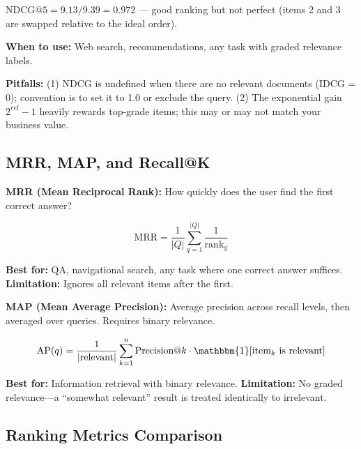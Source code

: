 $\text{NDCG}@5 = 9.13 / 9.39 = 0.972$ --- good ranking but not perfect (items 2 and 3 are swapped relative to the ideal order).

\textbf{When to use:} Web search, recommendations, any task with graded relevance labels.

\textbf{Pitfalls:} (1) NDCG is undefined when there are no relevant documents (IDCG = 0); convention is to set it to 1.0 or exclude the query. (2) The exponential gain $2^{rel} - 1$ heavily rewards top-grade items; this may or may not match your business value.

\subsection{MRR, MAP, and Recall@K}

\textbf{MRR (Mean Reciprocal Rank):} How quickly does the user find the first correct answer?

\[
\text{MRR} = \frac{1}{|Q|}\sum_{q=1}^{|Q|} \frac{1}{\text{rank}_q}
\]

\textbf{Best for:} QA, navigational search, any task where one correct answer suffices. \textbf{Limitation:} Ignores all relevant items after the first.

\textbf{MAP (Mean Average Precision):} Average precision across recall levels, then averaged over queries. Requires binary relevance.

\[
\text{AP}(q) = \frac{1}{|\text{relevant}|}\sum_{k=1}^{n} \text{Precision}@k \cdot \mathbbm{1}[\text{item}_k \text{ is relevant}]
\]

\textbf{Best for:} Information retrieval with binary relevance. \textbf{Limitation:} No graded relevance---a ``somewhat relevant'' result is treated identically to irrelevant.

\subsection{Ranking Metrics Comparison}


